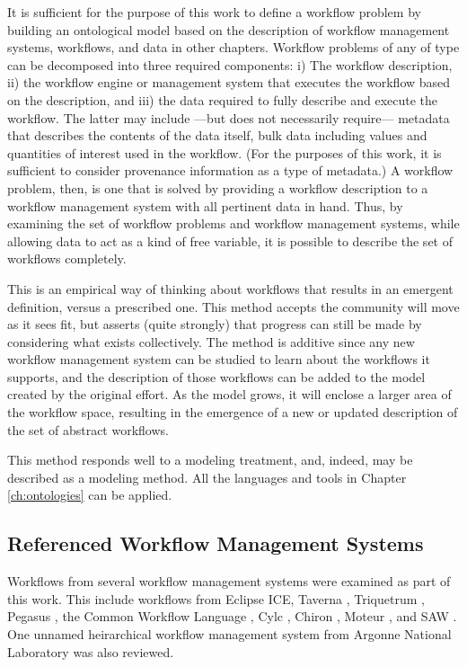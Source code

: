 It is sufficient for the purpose of this work to define a workflow problem
by building an ontological model based on the description of workflow
management systems, workflows, and data in other chapters. Workflow problems of
any of type can be decomposed into three required components: i) The workflow
description, ii) the workflow engine or management system that executes the
workflow based on the description, and iii) the data required to fully describe
and execute the workflow. The latter may include ---but does not necessarily
require--- metadata that describes the contents of the data itself, bulk data
including values and quantities of interest used in the workflow. (For the purposes of
this work, it is sufficient to consider provenance information as a type of
metadata.) A workflow problem, then, is one that is solved by providing a
workflow description to a workflow management system with all pertinent data in
hand. Thus, by examining the set of workflow problems and workflow management
systems, while allowing data to act as a kind of free variable, it is possible
to describe the set of workflows completely.

This is an empirical way of thinking about workflows that results in an emergent
definition, versus a prescribed one. This method accepts the community will
move as it sees fit, but asserts (quite strongly) that progress can still be
made by considering what exists collectively. The method is additive since
any new workflow management system can be studied to learn about the
workflows it supports, and the description of those workflows can be added to
the model created by the original effort. As the model grows, it will enclose a
larger area of the workflow space, resulting in the emergence of a new or
updated description of the set of abstract workflows.

This method responds well to a modeling treatment, and, indeed, may be described
as a modeling method. All the languages and tools in Chapter \ref{ch:ontologies}
can be applied.

\subsection{Referenced Workflow Management Systems}

Workflows from several workflow management systems were examined as part of this
work. This include workflows from Eclipse ICE, Taverna
\cite{wolstencroft_taverna_2013}, Triquetrum \cite{brooks_introducing_2016},
Pegasus \cite{noauthor_pegasus_nodate}, the Common Workflow Language
\cite{noauthor_common-workflow-language:_2018}, Cylc
\cite{j_oliver_cylc:_2018}, Chiron \cite{ ogasawara_chiron:_nodate}, Moteur
\cite{glatard_flexible_2008}, and SAW \cite{clay_incorporating_2015}. One
unnamed heirarchical workflow management system from Argonne National
Laboratory was also reviewed.


